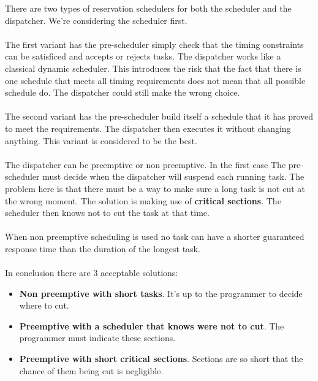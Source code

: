 \documentclass[../main.tex]{subfiles}
\begin{document}
There are two types of reservation schedulers for both the scheduler and the dispatcher. We're considering the scheduler first.\\\\
The first variant has the pre-scheduler simply check that the timing constraints can be satisficed and accepts or rejects tasks. The dispatcher works like a classical dynamic scheduler. This introduces the risk that the fact that there is one schedule that meets all timing requirements does not mean that all possible schedule do. The dispatcher could still make the wrong choice.
\\\\
The second variant has the pre-scheduler build itself a schedule that it has proved to meet the requirements. The dispatcher then executes it without changing anything. This variant is considered to be the best.
\\\\
The dispatcher can be preemptive or non preemptive. In the first case The pre-scheduler must decide when the dispatcher will suspend each running task. The problem here is that there must be a way to make sure a long task is not cut at the wrong moment. The solution is making use of \textbf{critical sections}. The scheduler then knows not to cut the task at that time. 
\\\\
When non preemptive scheduling is used no task can have a shorter guaranteed response time than the duration of the longest task.
\\\\
In conclusion there are 3 acceptable solutions:
\begin{itemize}
	\item \textbf{Non preemptive with short tasks}. It's up to the programmer to decide where to cut.
	\item \textbf{Preemptive with a scheduler that knows were not to cut}. The programmer must indicate these sections.
	\item \textbf{Preemptive with short critical sections}. Sections are so short that the chance of them being cut is negligible. 
\end{itemize}
\end{document}
